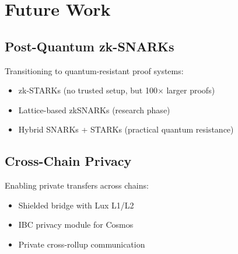 \section{Future Work}


\subsection{Post-Quantum zk-SNARKs}

Transitioning to quantum-resistant proof systems:
\begin{itemize}[leftmargin=1.1em]
  \item zk-STARKs (no trusted setup, but 100$\times$ larger proofs)
  \item Lattice-based zkSNARKs (research phase)
  \item Hybrid SNARKs + STARKs (practical quantum resistance)
\end{itemize}

\subsection{Cross-Chain Privacy}

Enabling private transfers across chains:
\begin{itemize}[leftmargin=1.1em]
  \item Shielded bridge with Lux L1/L2
  \item IBC privacy module for Cosmos
  \item Private cross-rollup communication
\end{itemize}

